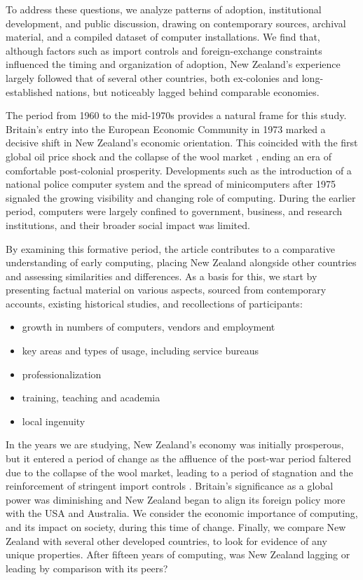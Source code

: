 \documentclass{IEEEcsmag}
\begin{document}
To address these questions, we analyze patterns of adoption, institutional development,
and public discussion, drawing on contemporary sources, archival material, and a compiled
dataset of computer installations. We find that, although factors such as import controls and
foreign-exchange constraints influenced the timing and organization of adoption, New Zealand's
experience largely followed that of several other countries, both ex-colonies and long-established
nations, but noticeably lagged behind comparable economies.

The period from 1960 to the mid-1970s provides a natural frame for this study.
Britain's entry into the European Economic Community in 1973 marked a decisive shift in
New Zealand's economic orientation. This coincided with the first global oil price shock and the
collapse of the wool market \cite{Easton-2020}, ending an era of comfortable post-colonial prosperity.
Developments such as the introduction of a national police computer system and the spread
of minicomputers after 1975 signaled the growing visibility and changing role of computing.
During the earlier period, computers were largely confined to government, business, and research
institutions, and their broader social impact was limited.

By examining this formative period, the article contributes to a comparative understanding
of early computing, placing New Zealand alongside other countries and assessing similarities
and differences. As a basis for this, we start by presenting factual material on various aspects,
sourced from contemporary accounts, existing historical studies, and recollections of participants:

\begin{itemize}
\item growth in numbers of computers, vendors and employment
\item key areas  and types of usage, including service bureaus
\item professionalization
\item training, teaching and academia
\item local ingenuity
\end{itemize}

In the years we are studying, New Zealand’s economy was initially prosperous,
but it entered a period of change as the affluence of the post-war period faltered due to the collapse of the wool market, leading to a period of stagnation and the reinforcement of stringent import controls \cite{Easton-2020}.
Britain's significance as a global power
was diminishing and New Zealand began to align its foreign policy more with the USA and Australia.
We consider the economic importance of computing, and its impact on society, during this time of change. Finally, we compare New Zealand with several other developed countries, to look for evidence of any unique properties. After fifteen years of computing, was New Zealand lagging or leading by comparison with its peers?
\end{document}

